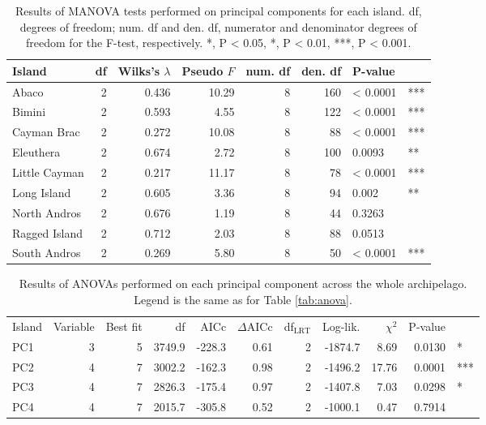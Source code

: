 \begin{table}[H]
    \centering
    \begin{tabular}{lrrrrrll}
    \hline
    Island & df & Wilks's $\lambda$ & Pseudo $F$ & num. df & den. df & P-value & \\
    \hline
    Abaco & 2 & 0.436 & 10.29 & 8 & 160 & < 0.0001 & ***\\
    Bimini & 2 & 0.593 & 4.55 & 8 & 122 & < 0.0001 & ***\\
    Cayman Brac & 2 & 0.272 & 10.08 & 8 & 88 & < 0.0001 & ***\\
    Eleuthera & 2 & 0.674 & 2.72 & 8 & 100 & 0.0093 & **\\
    Little Cayman & 2 & 0.217 & 11.17 & 8 & 78 & < 0.0001 & ***\\
    Long Island & 2 & 0.605 & 3.36 & 8 & 94 & 0.002 & **\\
    North Andros & 2 & 0.676 & 1.19 & 8 & 44 & 0.3263 & \\
    Ragged Island & 2 & 0.712 & 2.03 & 8 & 88 & 0.0513 & \\
    South Andros & 2 & 0.269 & 5.80 & 8 & 50 & < 0.0001 & ***\\
    \hline
    \end{tabular}
    \caption{Results of MANOVA tests performed on principal components for each island. df, degrees of freedom; num. df and den. df, numerator and denominator degrees of freedom for the F-test, respectively. *, P < 0.05, *, P < 0.01, ***, P < 0.001.}
    \label{suptab:manova}
\end{table}

\begin{table}[H]
    \centering
    \caption{Results of ANOVAs performed on each principal component across the whole archipelago. Legend is the same as for Table \ref{tab:anova}.}
    \begin{tabular}{lrrrrrrrrrl}
        \hline
        Island & Variable & Best fit & df & AICc & $\Delta$AICc & df$_{\mbox{LRT}}$ & Log-lik. & $\chi^2$ & P-value & \\
        PC1 & 3 & 5 & 3749.9 & -228.3 & 0.61 & 2 & -1874.7 & 8.69 & 0.0130 & *\\
        PC2 & 4 & 7 & 3002.2 & -162.3 & 0.98 & 2 & -1496.2 & 17.76 & 0.0001 & ***\\
        PC3 & 4 & 7 & 2826.3 & -175.4 & 0.97 & 2 & -1407.8 & 7.03 & 0.0298 & *\\
        PC4 & 4 & 7 & 2015.7 & -305.8 & 0.52 & 2 & -1000.1 & 0.47 & 0.7914 & \\
        \hline
    \end{tabular}
    \label{suptab:anova_pooled}
\end{table}

